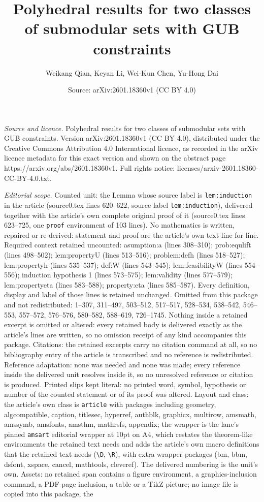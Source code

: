 \documentclass[10pt,a4paper]{amsart}
\title[Polyhedral results for two classes of submodular sets with G]{Polyhedral results for two classes of submodular sets with GUB constraints}
\author{Weikang Qian, Keyan Li, Wei-Kun Chen, Yu-Hong Dai}
\date{Source: arXiv:2601.18360v1 (CC BY 4.0)}
\begin{document}
\maketitle

\noindent\emph{Source and licence.} Polyhedral results for two classes of submodular sets with GUB constraints. Version arXiv:2601.18360v1 (CC BY 4.0), distributed under the Creative Commons Attribution 4.0 International licence, as recorded in the arXiv licence metadata for this exact version and shown on the abstract page https://arxiv.org/abs/2601.18360v1. Full rights notice: licenses/arxiv-2601.18360-CC-BY-4.0.txt.\par\smallskip

\noindent\textit{Editorial scope.} Counted unit: the Lemma whose source label is \texttt{lem:induction} in the article (source0.tex lines 620--622, source label \texttt{lem:induction}), delivered together with the article's own complete original proof of it (source0.tex lines 623--725, one \texttt{proof} environment of 103 lines). No mathematics is written, repaired or re-derived: statement and proof are the article's own text line for line. Required context retained uncounted: asumption:a (lines 308--310); prob:equlift (lines 498--502); lem:propertyU (lines 513--516); problem:defh (lines 518--527); lem:propertyh (lines 535--537); def:W (lines 543--545); lem:feasibilityW (lines 554--556); induction hypothesis 1 (lines 573--575); lem:validity (lines 577--579); lem:propertyeta (lines 583--588); property:eta (lines 585--587). Every definition, display and label of those lines is retained unchanged. Omitted from this package and not redistributed: 1--307, 311--497, 503--512, 517--517, 528--534, 538--542, 546--553, 557--572, 576--576, 580--582, 588--619, 726--1745. Nothing inside a retained excerpt is omitted or altered: every retained body is delivered exactly as the article's lines are written, so no omission receipt of any kind accompanies this package. Citations: the retained excerpts carry no citation command at all, so no bibliography entry of the article is transcribed and no reference is redistributed. Reference adaptation: none was needed and none was made; every reference inside the delivered unit resolves inside it, so no unresolved reference or citation is produced. Printed slips kept literal: no printed word, symbol, hypothesis or number of the counted statement or of its proof was altered. Layout and class: the article's own class is \texttt{article} with packages including geometry, algcompatible, caption, titlesec, hyperref, authblk, graphicx, multirow, amsmath, amssymb, amsfonts, amsthm, mathrsfs, appendix; the wrapper is the lane's pinned \texttt{amsart} editorial wrapper at 10pt on A4, which restates the theorem-like environments the retained text needs and adds the article's own macro definitions that the retained text needs (\texttt{\textbackslash D}, \texttt{\textbackslash R}), with extra wrapper packages (bm, bbm, dsfont, xspace, cancel, mathtools, cleveref). The delivered numbering is the unit's own. Assets: no retained span contains a figure environment, a graphics-inclusion command, a PDF-page inclusion, a table or a TikZ picture; no image file is copied into this package, the 
\end{document}
